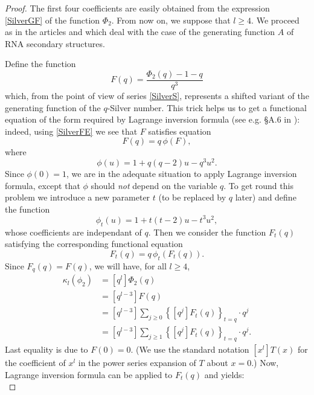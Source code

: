 \documentclass[11pt,reqno]{amsart}
\theoremstyle{plain}
\theoremstyle{definition}
\numberwithin{figure}{section}
\numberwithin{table}{section}
\numberwithin{equation}{section}
\newcommand\ka{\kappa}
\let\fr=\frac
\begin{document}
\begin{proof} 
The first four coefficients are easily obtained from the expression \eqref{SilverGF} of the function $\Phi_2$.
From now on, we suppose that $l≥4$. We proceed as in the articles \cite{BR23} and \cite{BFR24} which deal with the case of the generating function $A$ of RNA secondary structures.

Define the function 
\begin{equation*}
F(q)=\fr{\Phi_2(q)-1-q}{q^3}
\end{equation*} 
which, from the point of view of series \eqref{SilverS}, represents a shifted variant of the generating function of the $q$-Silver number. This trick helps us to get a  functional equation of the form required by Lagrange inversion formula (see e.g. §A.6 in \cite{FS}): indeed, using \eqref{SilverFE} we see that $F$ satisfies equation
\begin{equation*}
F(q)=q\,\phi(F),
\end{equation*}
where 
\begin{equation*}
\phi(u)=1+q(q-2)u-q^3 u^2.
\end{equation*}
Since $\phi(0)=1$, 
we are in the adequate situation to apply Lagrange inversion formula, except that  $\phi$ should \emph{not} depend on the variable $q$. To get round this problem we introduce a new parameter $t$ (to be replaced by $q$ later) and define the function
\begin{equation*}
\phi_t(u)=1+t(t-2)u-t^3 u^2,
\end{equation*}
whose coefficients are independant of $q$. Then we consider the function  $F_t(q)$ satisfying the corresponding functional equation
\begin{equation*}
F_t(q)=q\,\phi_t(F_t(q)).
\end{equation*}
Since $F_q(q)=F(q)$,  we will have, for all $l≥4$,
\begin{align*}
\ka_l(\phi_2)&=[q^l]\Phi_2(q)\\
&=[q^{l-3}]F(q)\\
&=[q^{l-3}]\sum_{j≥0}\left\{[q^j]F_t(q)\right\}_{t=q}\cdot q^j\\
&=[q^{l-3}]\sum_{j≥1}\left\{[q^j]F_t(q)\right\}_{t=q}\cdot q^j.
\end{align*}
Last equality is due to $F(0)=0$. (We use the standard notation $[x^l]T(x)$  for the coefficient of $x^l$ in the power series expansion of $T$ about $x=0$.) 
Now, Lagrange inversion formula can be applied to $F_t(q)$ and yields:
\begin{equation}\label{xurn}

\end{equation}
\end{proof}
\end{document}
